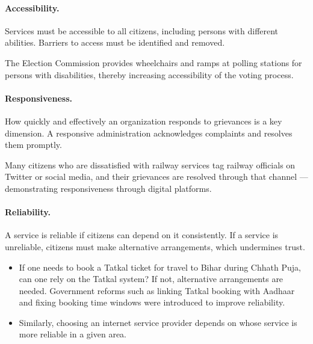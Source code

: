 \paragraph{Accessibility.} Services must be accessible to all citizens, including persons with different abilities. Barriers to access must be identified and removed.

\begin{ExampleBox}
The Election Commission provides wheelchairs and ramps at polling stations for persons with disabilities, thereby increasing accessibility of the voting process.
\end{ExampleBox}

\paragraph{Responsiveness.} How quickly and effectively an organization responds to grievances is a key dimension. A responsive administration acknowledges complaints and resolves them promptly.

\begin{ExampleBox}
Many citizens who are dissatisfied with railway services tag railway officials on Twitter or social media, and their grievances are resolved through that channel --- demonstrating responsiveness through digital platforms.
\end{ExampleBox}

\paragraph{Reliability.} A service is reliable if citizens can depend on it consistently. If a service is unreliable, citizens must make alternative arrangements, which undermines trust.

\begin{ExampleBox}
\begin{itemize}
\item If one needs to book a Tatkal ticket for travel to Bihar during Chhath Puja, can one rely on the Tatkal system? If not, alternative arrangements are needed. Government reforms such as linking Tatkal booking with Aadhaar and fixing booking time windows were introduced to improve reliability.
\item Similarly, choosing an internet service provider depends on whose service is more reliable in a given area.
\end{itemize}
\end{ExampleBox}

